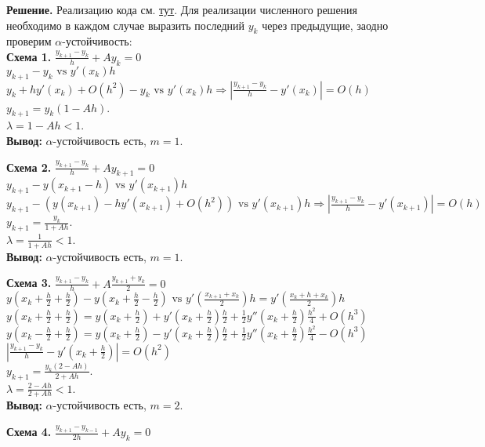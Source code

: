 \documentclass[14pt,a4paper]{extarticle}
\newcommand{\1}{\mathbbm{1}}
\begin{document}
\textbf{Решение.} 
Реализацию кода см. \href{https://github.com/VsevolodZaostrovsky/NumericalMethods/tree/main/Differential%20Equations/Code/src}{тут}. 
Для реализации численного решения необходимо в каждом случае выразить последний $y_k$ через предыдущие, заодно проверим 
$\alpha$-устойчивость: \\
\textbf{Схема 1.} $\frac{y_{k+1}-y_k}{h}+A y_k=0 $\\ 
$y_{k+1}-y_k \text{ vs } y'(x_k) h $\\ 
$y_{k} + h y'(x_k) + O(h^2) - y_k \text{ vs } y'(x_k) h \Rightarrow {|\frac{y_{k+1}-y_k}{h} - y'(x_k)| = O(h)}$ \\ 
$y_{k+1} = y_k (1 - Ah)$. \\
$\lambda = 1 - A h < 1$. \\
\textbf{Вывод:} $\alpha$-устойчивость есть, $m=1$.
\par
\textbf{Схема 2.} $\frac{y_{k+1}-y_k}{h}+A y_{k+1}=0$ \\ 
$y_{k+1}-y(x_{k+1} - h) \text{ vs } y'(x_{k+1}) h $\\ 
$y_{k+1} -( y(x_{k+1}) - h y'(x_{k+1}) + O(h^2)) \text{ vs } y'(x_{k+1}) h \Rightarrow {|\frac{y_{k+1}-y_k}{h} - y'(x_{k+1})| = O(h)}$ \\ 
$y_{k+1} = \frac{y_k}{1 + Ah} $.\\
$\lambda = \frac{1}{1 + Ah} < 1$. \\
\textbf{Вывод:} $\alpha$-устойчивость есть, $m=1$.
\par
\textbf{Схема 3.} $\frac{y_{k+1}-y_k}{h}+A \frac{y_{k+1}+y_k}{2}=0 $\\ 
$y(x_k + \frac{h}{2} + \frac{h}{2}) - y(x_k + \frac{h}{2} - \frac{h}{2}) \text{ vs } y'(\frac{x_{k+1} + x_k}{2}) h = y'(\frac{x_{k} + h + x_k}{2}) h$\\ 
$y(x_k + \frac{h}{2} + \frac{h}{2}) = y(x_k + \frac{h}{2}) + y'(x_k + \frac{h}{2}) \frac{h}{2} + \frac{1}{2} y''(x_k + \frac{h}{2}) \frac{h^2}{4} + O(h^3)$\\
$y(x_k - \frac{h}{2} + \frac{h}{2}) = y(x_k + \frac{h}{2}) - y'(x_k + \frac{h}{2}) \frac{h}{2} + \frac{1}{2} y''(x_k + \frac{h}{2}) \frac{h^2}{4} - O(h^3)$\\ 
$|\frac{y_{k+1}-y_k}{h} - y'(x_k + \frac{h}{2})| = O(h^2)$\\ 
$y_{k+1} = \frac{y_k (2 - A h)}{2 + Ah} $. \\
$\lambda = \frac{2 - A h}{2+ A h} < 1$. \\
\textbf{Вывод:} $\alpha$-устойчивость есть, $m=2$.
\par
\textbf{Схема 4.} $\frac{y_{k+1}-y_{k-1}}{2 h}+A y_k=0$ \\
\end{document}
